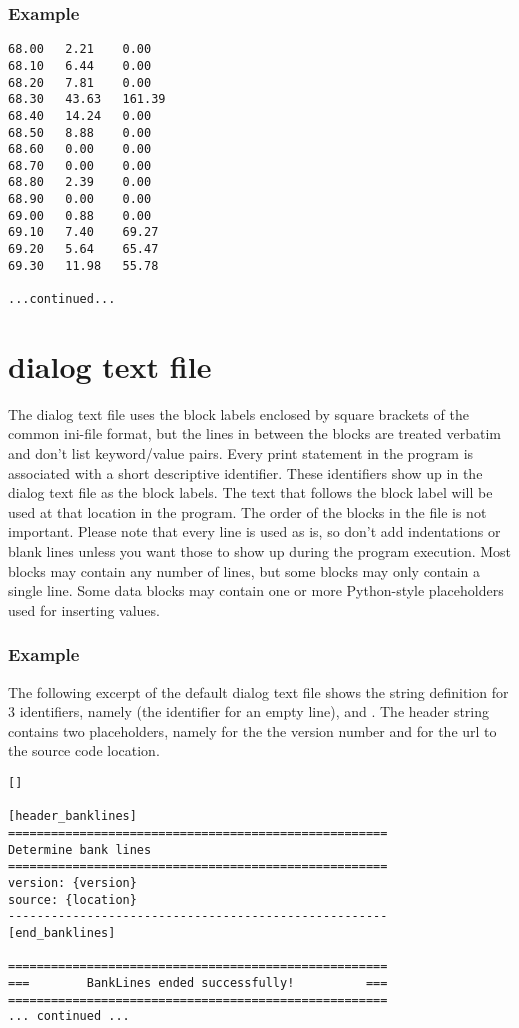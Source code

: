 \subsubsection*{Example}

\begin{Verbatim}
68.00   2.21    0.00
68.10   6.44    0.00
68.20   7.81    0.00
68.30   43.63   161.39
68.40   14.24   0.00
68.50   8.88    0.00
68.60   0.00    0.00
68.70   0.00    0.00
68.80   2.39    0.00
68.90   0.00    0.00
69.00   0.88    0.00
69.10   7.40    69.27
69.20   5.64    65.47
69.30   11.98   55.78

...continued...
\end{Verbatim}

\section{dialog text file}

The dialog text file uses the block labels enclosed by square brackets of the common ini-file format, but the lines in between the blocks are treated verbatim and don't list keyword/value pairs.
Every print statement in the program is associated with a short descriptive identifier.
These identifiers show up in the dialog text file as the block labels.
The text that follows the block label will be used at that location in the program.
The order of the blocks in the file is not important.
Please note that every line is used as is, so don't add indentations or blank lines unless you want those to show up during the program execution.
Most blocks may contain any number of lines, but some blocks may only contain a single line.
Some data blocks may contain one or more Python-style placeholders used for inserting values.

\subsubsection*{Example}

The following excerpt of the default  dialog text file shows the string definition for 3 identifiers, namely  (the identifier for an empty line),  and .
The header string contains two placeholders, namely  for the the version number and  for the url to the source code location.

\begin{Verbatim}
[]

[header_banklines]
=====================================================
Determine bank lines
=====================================================
version: {version}
source: {location}
-----------------------------------------------------
[end_banklines]

=====================================================
===        BankLines ended successfully!          ===
=====================================================
... continued ...
\end{Verbatim}